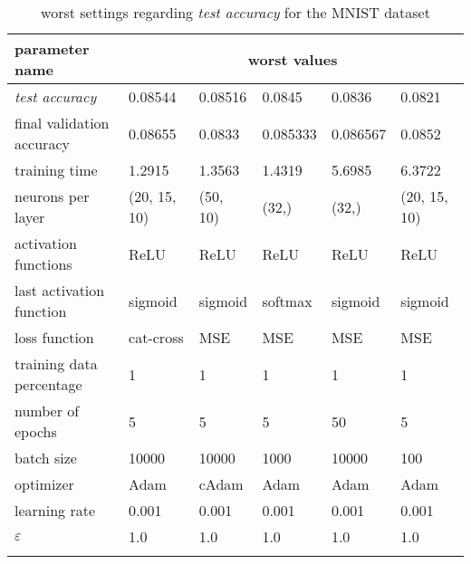 \begin{longtable}{|l|l|l|l|l|>{\columncolor{worstColumnColor}}l|}
\hline
\textbf{parameter name} & \multicolumn{5}{c|}{\textbf{worst values}} \\
\hline
\textit{test accuracy}   & 0.08544 & 0.08516 &  0.0845 &  0.0836 &  0.0821 \\
final validation accuracy & 0.08655 & 0.0833  & 0.085333 & 0.086567 & 0.0852  \\
training time            & 1.2915  & 1.3563  & 1.4319  & 5.6985  & 6.3722  \\
neurons per layer        & (20, 15, 10) & (50, 10) & (32,)   & (32,)   & (20, 15, 10) \\
{\color{equalParamColor} activation functions } & {\color{equalParamColor} ReLU } & {\color{equalParamColor} ReLU } & {\color{equalParamColor} ReLU } & {\color{equalParamColor} ReLU } & {\color{equalParamColor} ReLU } \\
last activation function & sigmoid & sigmoid & softmax & sigmoid & sigmoid \\
loss function            & cat-cross & MSE     & MSE     & MSE     & MSE     \\
{\color{equalParamColor} training data percentage } & {\color{equalParamColor} 1 } & {\color{equalParamColor} 1 } & {\color{equalParamColor} 1 } & {\color{equalParamColor} 1 } & {\color{equalParamColor} 1 } \\
number of epochs         & 5       & 5       & 5       & 50      & 5       \\
batch size               & 10000   & 10000   & 1000    & 10000   & 100     \\
optimizer                & Adam    & cAdam   & Adam    & Adam    & Adam    \\
{\color{equalParamColor} learning rate } & {\color{equalParamColor} 0.001 } & {\color{equalParamColor} 0.001 } & {\color{equalParamColor} 0.001 } & {\color{equalParamColor} 0.001 } & {\color{equalParamColor} 0.001 } \\
{\color{equalParamColor} $\varepsilon$ } & {\color{equalParamColor} 1.0 } & {\color{equalParamColor} 1.0 } & {\color{equalParamColor} 1.0 } & {\color{equalParamColor} 1.0 } & {\color{equalParamColor} 1.0 } \\
\hline

\caption{worst settings regarding \textit{test accuracy} for the MNIST dataset}
\label{table:test_accuracy_worst_mnist}
\end{longtable}
